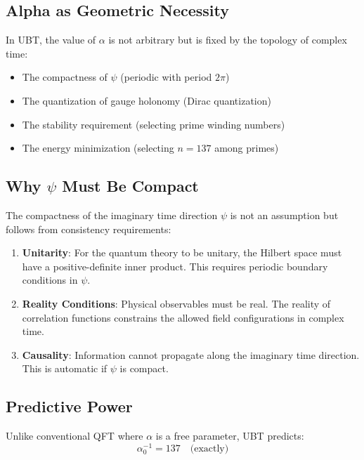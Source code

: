 \documentclass[12pt, a4paper]{article}
\theoremstyle{definition}
\theoremstyle{remark}
\begin{document}
\subsection{Alpha as Geometric Necessity}

In UBT, the value of $\alpha$ is not arbitrary but is fixed by the topology of complex time:
\begin{itemize}
\item The compactness of $\psi$ (periodic with period $2\pi$)
\item The quantization of gauge holonomy (Dirac quantization)
\item The stability requirement (selecting prime winding numbers)
\item The energy minimization (selecting $n = 137$ among primes)
\end{itemize}

\subsection{Why $\psi$ Must Be Compact}

The compactness of the imaginary time direction $\psi$ is not an assumption but follows from consistency requirements:

\begin{enumerate}
\item \textbf{Unitarity}: For the quantum theory to be unitary, the Hilbert space must have a positive-definite inner product. This requires periodic boundary conditions in $\psi$.

\item \textbf{Reality Conditions}: Physical observables must be real. The reality of correlation functions constrains the allowed field configurations in complex time.

\item \textbf{Causality}: Information cannot propagate along the imaginary time direction. This is automatic if $\psi$ is compact.
\end{enumerate}

\subsection{Predictive Power}

Unlike conventional QFT where $\alpha$ is a free parameter, UBT predicts:
\begin{equation}
\alpha_0^{-1} = 137 \quad \text{(exactly)}
\end{equation}
\end{document}
